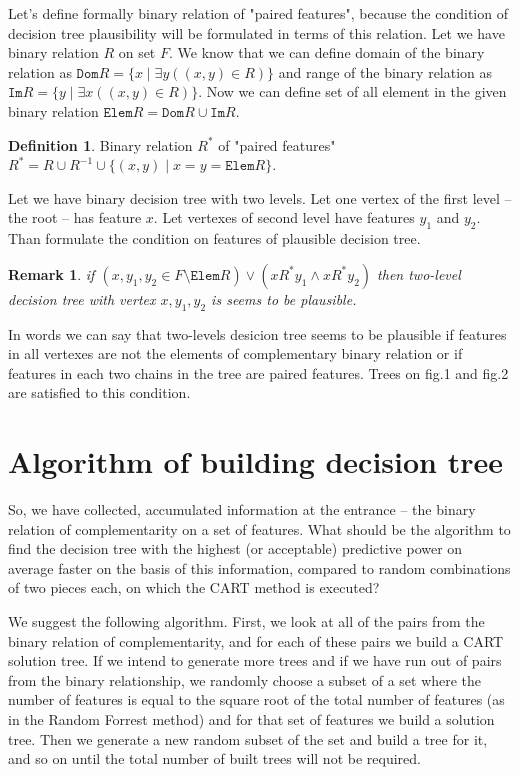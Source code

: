 \documentclass[conference]{IEEEtran}
\newtheorem{remark}{Remark}
\theoremstyle{definition}
\newtheorem{definition}{Definition}[section]
\begin{document}
Let's define formally binary relation of "paired features", because the condition of decision tree plausibility will be formulated in terms of this relation. Let we have binary relation $R$ on set $F$. We know that we can define domain of the binary relation as $\texttt{Dom} R = \{x \mid \exists y ((x, y) \in R)\}$ and range of the binary relation as $\texttt{Im} R = \{y \mid \exists x ((x, y) \in R)\}$. Now we can define set of all element in the given binary relation $\texttt{Elem} R = \texttt{Dom} R \cup \texttt{Im} R$. 

\theoremstyle{definition}
\begin{definition}{Binary relation $R^*$ of "paired features" \\ $R^* = R \cup R^{-1} \cup \{(x, y) \mid x = y= \texttt{Elem} R\}$.
}
\end{definition}


Let we have binary decision tree with two levels. Let one vertex of the first level -- the root -- has feature $x$. Let vertexes of second level have features $y_1$ and $y_2$. Than formulate the condition on features of plausible decision tree.

\begin{remark}{
if $(x, y_1, y_2 \in F  \setminus \texttt{Elem} R) \lor (xR^*y_1 \land xR^*y_2)$ then two-level decision tree with vertex $x, y_1, y_2$ is seems to be plausible. 
}
\end{remark}

In words we can say that two-levels desicion tree seems to be plausible if features in all vertexes are not the elements of complementary binary relation or if features in each two chains in the tree are paired features. Trees on fig.1 and fig.2 are satisfied to this condition.    

\section{Algorithm of building decision tree}

So, we have collected, accumulated information at the entrance -- the binary relation of complementarity on a set of features. What should be the algorithm to find the decision tree with the highest (or acceptable) predictive power on average faster on the basis of this information, compared to random combinations of two pieces each, on which the CART method is executed?


We suggest the following algorithm. First, we look at all of the pairs from the binary relation of complementarity, and for each of these pairs we build a CART solution tree.  If we intend to generate more trees and if we have run out of pairs from the binary relationship, we randomly choose a subset of a set where the number of features is equal to the square root of the total number of features (as in the Random Forrest method) and for that set of features we build a solution tree. Then we generate a new random subset of the set and build a tree for it, and so on until the total number of built trees will not be required.
\end{document}
